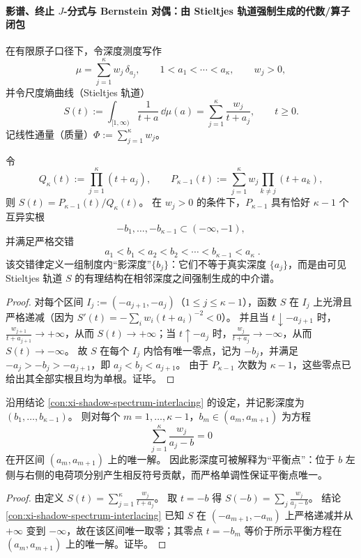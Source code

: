 \paragraph{影谱、终止 \texorpdfstring{$J$}{J}-分式与 Bernstein 对偶：由 Stieltjes 轨道强制生成的代数/算子闭包}
在有限原子口径下，令深度测度写作
\[
\mu=\sum_{j=1}^{\kappa} w_j\,\delta_{a_j},
\qquad
1<a_1<\cdots<a_\kappa,
\qquad
w_j>0,
\]
并令尺度熵曲线（Stieltjes 轨道）
\[
S(t):=\int_{[1,\infty)}\frac{1}{t+a}\,\dd\mu(a)
=\sum_{j=1}^{\kappa}\frac{w_j}{t+a_j},
\qquad t\ge 0.
\]
记线性通量（质量）\(\Phi:=\sum_{j=1}^{\kappa}w_j\)。

\begin{proposition}\label{con:xi-shadow-spectrum-interlacing}
令
\[
Q_{\kappa}(t):=\prod_{j=1}^{\kappa}(t+a_j),
\qquad
P_{\kappa-1}(t):=\sum_{j=1}^{\kappa} w_j\!\!\prod_{k\ne j}(t+a_k),
\]
则 \(S(t)=P_{\kappa-1}(t)/Q_{\kappa}(t)\)。
在 \(w_j>0\) 的条件下，\(P_{\kappa-1}\) 具有恰好 \(\kappa-1\) 个互异实根
\[
-b_1,\dots,-b_{\kappa-1}\subset(-\infty,-1),
\]
并满足严格交错
\[
\boxed{\;
a_1<b_1<a_2<b_2<\cdots<b_{\kappa-1}<a_{\kappa}\; }.
\]
该交错律定义一组制度内“影深度”\(\{b_j\}\)：它们不等于真实深度 \(\{a_j\}\)，而是由可见 Stieltjes 轨道 \(S\) 的有理结构在相邻深度之间强制生成的中介谱。
\end{proposition}
\begin{proof}
对每个区间 \(I_j:=(-a_{j+1},-a_j)\)（\(1\le j\le \kappa-1\)），函数 \(S\) 在 \(I_j\) 上光滑且严格递减（因为 \(S'(t)=-\sum_i w_i(t+a_i)^{-2}<0\)）。
并且当 \(t\downarrow -a_{j+1}\) 时，\(\frac{w_{j+1}}{t+a_{j+1}}\to +\infty\)，从而 \(S(t)\to +\infty\)；当 \(t\uparrow -a_j\) 时，\(\frac{w_{j}}{t+a_{j}}\to -\infty\)，从而 \(S(t)\to -\infty\)。
故 \(S\) 在每个 \(I_j\) 内恰有唯一零点，记为 \(-b_j\)，并满足 \(-a_j>-b_j>-a_{j+1}\)，即 \(a_j<b_j<a_{j+1}\)。
由于 \(P_{\kappa-1}\) 次数为 \(\kappa-1\)，这些零点已给出其全部实根且均为单根。证毕。
\end{proof}

\begin{corollary}\label{cor:xi-shadow-depth-electrostatic-balance}
沿用结论 \ref{con:xi-shadow-spectrum-interlacing} 的设定，并记影深度为 \((b_1,\dots,b_{\kappa-1})\)。
则对每个 \(m=1,\dots,\kappa-1\)，\(b_m\in(a_m,a_{m+1})\) 为方程
\[
\boxed{\;
\sum_{j=1}^{\kappa}\frac{w_j}{a_j-b}=0\;}
\]
在开区间 \((a_m,a_{m+1})\) 上的唯一解。
因此影深度可被解释为“平衡点”：位于 \(b\) 左侧与右侧的电荷项分别产生相反符号贡献，而严格单调性保证平衡点唯一。
\end{corollary}
\begin{proof}
由定义 \(S(t)=\sum_{j=1}^{\kappa}\frac{w_j}{t+a_j}\)。
取 \(t=-b\) 得 \(S(-b)=\sum_j \frac{w_j}{a_j-b}\)。
结论 \ref{con:xi-shadow-spectrum-interlacing} 已知 \(S\) 在 \((-a_{m+1},-a_m)\) 上严格递减并从 \(+\infty\) 变到 \(-\infty\)，故在该区间唯一取零；其零点 \(t=-b_m\) 等价于所示平衡方程在 \((a_m,a_{m+1})\) 上的唯一解。证毕。
\end{proof}

